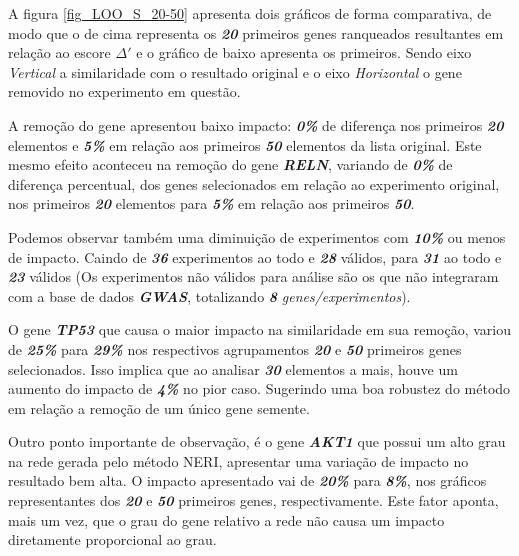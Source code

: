 A figura \ref{fig_LOO_S_20-50} apresenta dois gráficos de forma comparativa, de modo que o de cima representa os \textbf{\textit{20}} primeiros genes ranqueados resultantes em relação ao escore $\Delta'$ e o gráfico de baixo apresenta os \textbf{} primeiros. Sendo eixo \textit{Vertical} a similaridade com o resultado original e o eixo \textit{Horizontal} o gene removido no experimento em questão.
%

A remoção do gene \textbf{} apresentou baixo impacto: \textbf{\textit{0\%}} de diferença nos primeiros \textbf{\textit{20}} elementos e  \textbf{\textit{5\%}} em relação aos primeiros \textbf{\textit{50}} elementos da lista original.
%
Este mesmo efeito aconteceu na remoção do gene \textbf{\textit{RELN}}, variando de \textbf{\textit{0\%}} de diferença percentual, dos genes selecionados em relação ao experimento original, nos primeiros \textbf{\textit{20}} elementos para \textbf{\textit{5\%}} em relação aos primeiros \textbf{\textit{50}}.
%

Podemos observar também uma diminuição de experimentos com \textbf{\textit{10\%}} ou menos de impacto. Caindo de \textbf{\textit{36}} experimentos ao todo e \textbf{\textit{28}} válidos, para \textbf{\textit{31}} ao todo e \textbf{\textit{23}} válidos (Os experimentos não válidos para análise são os que não integraram com a base de dados \textbf{\textit{GWAS}}, totalizando \textbf{\textit{8}} \textit{genes/experimentos}).
%

O gene \textbf{\textit{TP53}} que causa o maior impacto na similaridade em sua remoção, variou de \textbf{\textit{25\%}} para \textbf{\textit{29\%}} nos respectivos agrupamentos \textbf{\textit{20}} e \textbf{\textit{50}} primeiros genes selecionados. Isso implica que ao analisar \textbf{\textit{30}} elementos a mais, houve um aumento do impacto de \textbf{\textit{4\%}} no pior caso. Sugerindo uma boa robustez do método em relação a remoção de um único gene semente.
%

Outro ponto importante de observação, é o gene \textsl{\textbf{AKT1}} que possui um alto grau na rede gerada pelo método NERI, apresentar uma variação de impacto no resultado bem alta. O impacto apresentado vai de \textsl{\textbf{20\%}} para \textsl{\textbf{8\%}}, nos gráficos representantes dos \textsl{\textbf{20}} e \textsl{\textbf{50}} primeiros genes, respectivamente.
Este fator aponta, mais um vez, que o grau do gene relativo a rede não causa um impacto diretamente proporcional ao grau.

%

